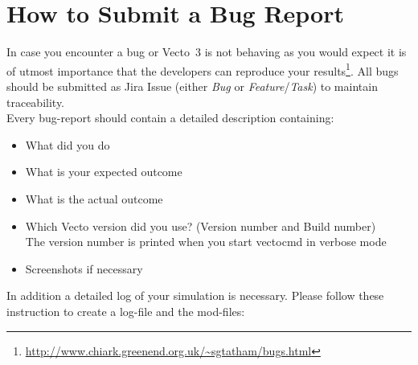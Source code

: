 
\FloatBarrier
\section{How to Submit a Bug Report} %
\label{sec:how_to_submit_a_bug_report}

In case you encounter a bug or Vecto~3 is not behaving as you would expect it is of utmost importance that the developers can reproduce your results\footnote{\url{http://www.chiark.greenend.org.uk/~sgtatham/bugs.html}}. All bugs should be submitted as Jira Issue (either \textit{Bug} or \textit{Feature}/\textit{Task}) to maintain traceability. \\[0.5em]

Every bug-report should contain a detailed description containing:
\begin{itemize}
	\item What did you do
	\item What is your expected outcome
	\item What is the actual outcome
	\item Which Vecto version did you use? (Version number and Build number) \\
		The version number is printed when you start vectocmd in verbose mode
	\item Screenshots if necessary
\end{itemize}

In addition a detailed log of your simulation is necessary. Please follow these instruction to create a log-file and the mod-files:

